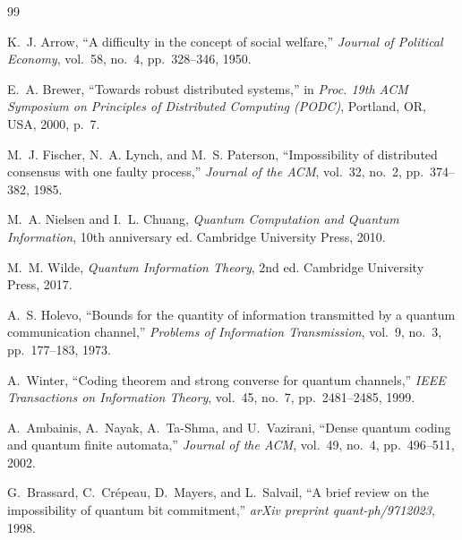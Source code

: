 \documentclass{ieeeaccess}
\begin{document}
\begin{thebibliography}{99}

K.~J. Arrow, ``A difficulty in the concept of social welfare,''
\emph{Journal of Political Economy}, vol.~58, no.~4, pp.~328--346, 1950.

E.~A. Brewer, ``Towards robust distributed systems,''
in \emph{Proc. 19th ACM Symposium on Principles of Distributed Computing (PODC)},
Portland, OR, USA, 2000, p.~7.

M.~J. Fischer, N.~A. Lynch, and M.~S. Paterson,
``Impossibility of distributed consensus with one faulty process,''
\emph{Journal of the ACM}, vol.~32, no.~2, pp.~374--382, 1985.

M.~A. Nielsen and I.~L. Chuang, \emph{Quantum Computation and Quantum Information},
10th anniversary ed. Cambridge University Press, 2010.

M.~M. Wilde, \emph{Quantum Information Theory}, 2nd ed. Cambridge University Press, 2017.

A.~S. Holevo, ``Bounds for the quantity of information transmitted by a quantum
communication channel,'' \emph{Problems of Information Transmission}, vol.~9, no.~3,
pp.~177--183, 1973.

A.~Winter, ``Coding theorem and strong converse for quantum channels,''
\emph{IEEE Transactions on Information Theory}, vol.~45, no.~7, pp.~2481--2485, 1999.

A.~Ambainis, A.~Nayak, A.~Ta-Shma, and U.~Vazirani, ``Dense quantum coding and
quantum finite automata,'' \emph{Journal of the ACM}, vol.~49, no.~4, pp.~496--511, 2002.

G.~Brassard, C.~Crépeau, D.~Mayers, and L.~Salvail, ``A brief review on the
impossibility of quantum bit commitment,''
\emph{arXiv preprint quant-ph/9712023}, 1998.


\end{thebibliography}
\end{document}
